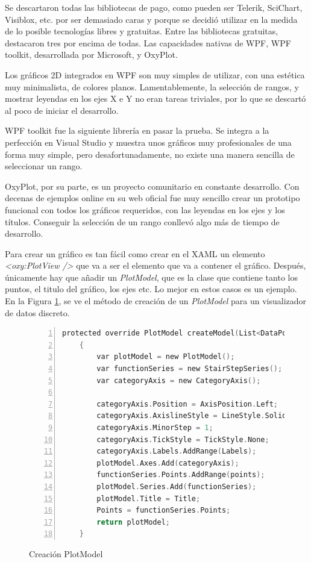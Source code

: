 Se descartaron todas las bibliotecas de pago, como pueden ser Telerik, SciChart, Visiblox, etc. por ser demasiado caras
y porque se decidi\'o utilizar en la medida de lo posible tecnolog\'ias libres y gratuitas. Entre las bibliotecas
gratuitas, destacaron tres por encima de todas. Las capacidades nativas de WPF,
WPF toolkit, desarrollada por Microsoft, y OxyPlot.

Los gr\'aficos 2D integrados en WPF son muy simples de utilizar, con una est\'etica muy minimalista, de colores planos.
Lamentablemente, la selecci\'on de rangos, y mostrar leyendas en los ejes X e Y no eran tareas triviales, por lo que
se descart\'o al poco de iniciar el desarrollo.

WPF toolkit fue la siguiente librer\'ia en pasar la prueba. Se integra a la perfecci\'on 
en Visual Studio y muestra unos gr\'aficos muy profesionales de una forma
muy simple, pero desafortunadamente, no existe una manera sencilla de seleccionar un rango.

OxyPlot, por su parte, es un proyecto comunitario en constante desarrollo. Con decenas de ejemplos online en su web
oficial fue muy sencillo crear un prototipo funcional con todos los gr\'aficos requeridos, con las leyendas en los ejes
y los t\'itulos. Conseguir la selecci\'on de un rango conllev\'o algo m\'as de tiempo de desarrollo.

Para crear un gr\'afico es tan f\'acil como crear en el XAML un elemento \emph{<oxy:PlotView />} que va a ser el 
elemento que va a contener el gr\'afico. Despu\'es, \'unicamente hay que a\~nadir un \emph{PlotModel}, que es la
clase que contiene tanto los puntos, el titulo del gr\'afico, los ejes etc. Lo mejor en estos casos es un ejemplo.
En la Figura \ref{CreacionPlotModel}, se ve el m\'etodo de creaci\'on de un \emph{PlotModel} para un visualizador de datos
discreto.

\begin{figure}[h]
    \begin{lstlisting}[tabsize=2, language=C, numbers=left, showspaces=false, breaklines=true]
    protected override PlotModel createModel(List<DataPoint> points)
    {
        var plotModel = new PlotModel();
        var functionSeries = new StairStepSeries();
        var categoryAxis = new CategoryAxis();
        
        categoryAxis.Position = AxisPosition.Left;
        categoryAxis.AxislineStyle = LineStyle.Solid;
        categoryAxis.MinorStep = 1;
        categoryAxis.TickStyle = TickStyle.None;
        categoryAxis.Labels.AddRange(Labels);
        plotModel.Axes.Add(categoryAxis);
        functionSeries.Points.AddRange(points);
        plotModel.Series.Add(functionSeries);
        plotModel.Title = Title;
        Points = functionSeries.Points;
        return plotModel;
    }
    \end{lstlisting}
    \caption[Creaci\'on PlotModel]{Creaci\'on PlotModel}
    \label{CreacionPlotModel}
\end{figure}

